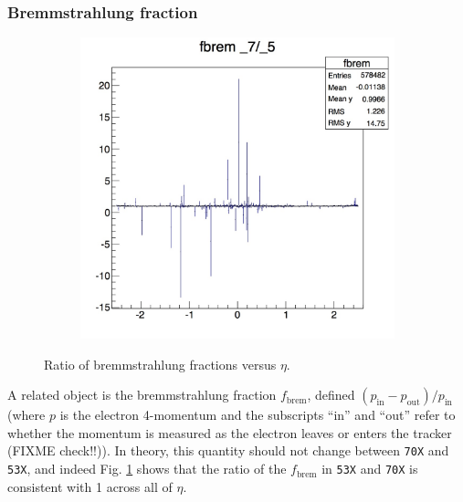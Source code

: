 \documentclass[10pt]{article}
\begin{document}
\subsubsection{Bremmstrahlung fraction}
\begin{figure}[h!]
        \centering
        \begin{subfigure}[b]{0.4\textwidth}
                \includegraphics[width=\textwidth]{Plots/fbrem}

             
        \end{subfigure}%

        \caption{Ratio of bremmstrahlung fractions versus $\eta$.}\label{fbremValidation}
\end{figure}
A related object is the bremmstrahlung fraction $f_{\text{brem}}$, defined $(p_{\text{in}} -p_{\text{out}})/p_{\text{in}}$ (where $p$ is the electron 4-momentum and the subscripts ``in'' and ``out'' refer to whether the momentum is measured as the electron leaves or enters the tracker (FIXME check!!)). In theory, this quantity should not change between \texttt{70X} and \texttt{53X}, and indeed Fig. \ref{fbremValidation} shows that the ratio of the $f_{\text{brem}}$ in \texttt{53X} and \texttt{70X} is consistent with 1 across all of $\eta$.
\end{document}
